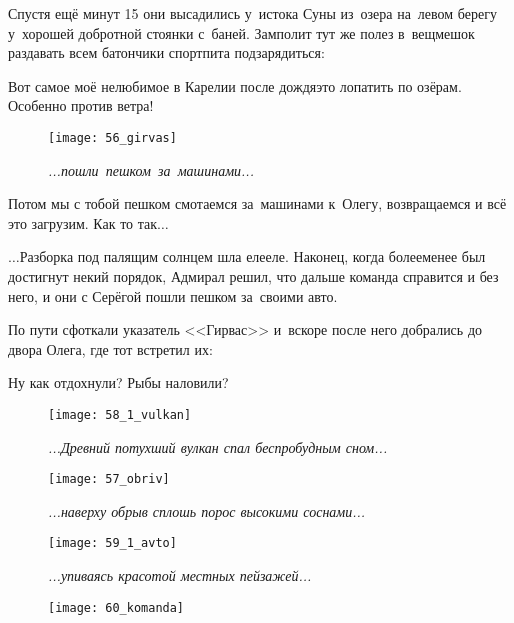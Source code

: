 Спустя ещё минут 15 они высадились у~истока Суны из~озера на~левом берегу у~хорошей добротной стоянки с~баней. Замполит тут же полез в~вещмешок раздавать всем батончики спортпита подзарядиться:

\diagdash Вот самое моё нелюбимое в Карелии после дождя\mdash это лопатить по озёрам. Особенно против ветра!

\newpage
\begin{wrapfigure}[18]{l}{0.5\textwidth}
	\centering
	\texttt{[image: 56\_girvas]}
	\caption{\small\textit{...пошли~пешком~за~машинами...}}
\end{wrapfigure} Потом мы с тобой пешком смотаемся за~машинами к~Олегу, возвращаемся и всё это загрузим. Как то так$\ldots$

$\ldots$Разборка под палящим солнцем шла еле\sdash еле. Наконец, когда более\sdash менее был достигнут некий порядок, Адмирал решил, что дальше команда справится и без него, и они с Серёгой пошли пешком за~своими авто.

По пути сфоткали указатель <<Гирвас>> и~вскоре после него добрались до двора Олега, где тот встретил их:

\diagdash Ну как отдохнули? Рыбы наловили?

\newpage

\begin{figure}[h]
	\centering
	\texttt{[image: 58\_1\_vulkan]}
	\caption{\small\textit{...Древний потухший вулкан спал беспробудным сном...}}
\end{figure}

\begin{figure}[h]
	\centering
	\texttt{[image: 57\_obriv]}
	\caption{\small\textit{...наверху обрыв сплошь порос высокими соснами...}}
\end{figure}

\begin{figure}[h]
	\centering
	\texttt{[image: 59\_1\_avto]}
	\caption{\small\textit{...упиваясь красотой местных пейзажей...}}
\end{figure}

\begin{figure}[!h]
	\centering
	\texttt{[image: 60\_komanda]}
\end{figure}
